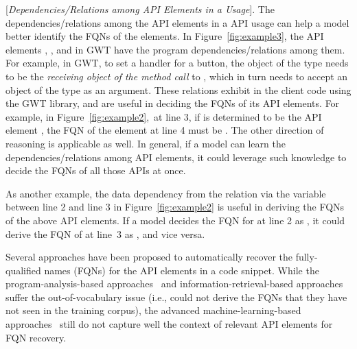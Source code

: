 \vspace{2pt}
 [{\em Dependencies/Relations among API
    Elements in a Usage}]. The dependencies/relations among the API
elements in a API usage can help a model better identify the FQNs of
the elements.  In Figure~\ref{fig:example3}, the API elements
, , and  in GWT
have the program dependencies/relations among them. For example, in
GWT, to set a handler for a button, the object of the type
 needs to be the {\em receiving object of the method
  call} to , which in turn needs to accept an
object of the type  as an argument. These relations
exhibit in the client code using the GWT library, and are useful in
deciding the FQNs of its API elements. For example, in
Figure~\ref{fig:example2},~at line 3, if  is
determined to be the API element
, the
FQN of the element at line 4 must be
.  The
other direction of reasoning is applicable as well. In general, if a
model can learn the dependencies/relations among API elements, it
could leverage such knowledge to decide the FQNs of all those APIs at once.


As another example, the data dependency from the 
relation via the variable  between line 2 and line 3 in
Figure~\ref{fig:example2} is useful in deriving the FQNs of the
above API elements. If a model decides the FQN for  at
line 2 as , it
could derive the FQN of  at line~3 as
,
and vice versa.


 Several approaches have been
proposed to automatically recover the fully-qualified names (FQNs) for
the API elements in a code snippet.  While the program-analysis-based
approaches~\cite{tien} and information-retrieval-based
approaches~\cite{tien} suffer the out-of-vocabulary issue (i.e., could
not derive the FQNs that they have not seen in the training corpus),
the advanced machine-learning-based approaches~\cite{tien} still do
not capture well the context of relevant API elements for FQN
recovery.

